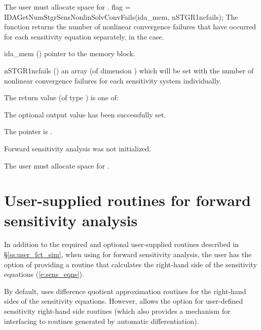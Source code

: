 {
  {\warn}The user must allocate space for .
}
{
  flag = IDAGetNumStgrSensNonlinSolvConvFails(ida\_mem, nSTGR1ncfails);
}
{
  The function  returns the
  number of nonlinear convergence failures that have occurred for
  each sensitivity equation separately, in the  case.
}
{
  \begin{args}
  \item[ida\_mem] ()
    pointer to the {\idas} memory block.
  \item[nSTGR1ncfails] ()
    an array (of dimension ) which will be set with the
    number of nonlinear convergence failures for each sensitivity system individually.
  \end{args}
}
{
  The return value  (of type ) is one of:
  \begin{args}
  \item[\Id{IDA\_SUCCESS}] 
    The optional output value has been successfully set.
  \item[\Id{IDA\_MEM\_NULL}]
    The  pointer is .
  \item[\Id{IDA\_NO\_SENS}]
    Forward sensitivity analysis was not initialized.
  \end{args}
}
{
  {\warn}The user must allocate space for .
}
\section{User-supplied routines for forward sensitivity analysis}
\label{s:user_fct_fwd}

In addition to the required and optional user-supplied routines described
in \S\ref{ss:user_fct_sim}, when using {\idas} for forward sensitivity analysis,
the user has the option of providing a routine that calculates the right-hand side 
of the sensitivity equations (\ref{e:sens_eqns}).

By default, {\idas} uses difference quotient approximation routines for the right-hand
sides of the sensitivity equations.
However, {\idas} allows the option for user-defined sensitivity right-hand side routines
(which also provides a mechanism for interfacing {\idas} to routines
generated by automatic differentiation).

